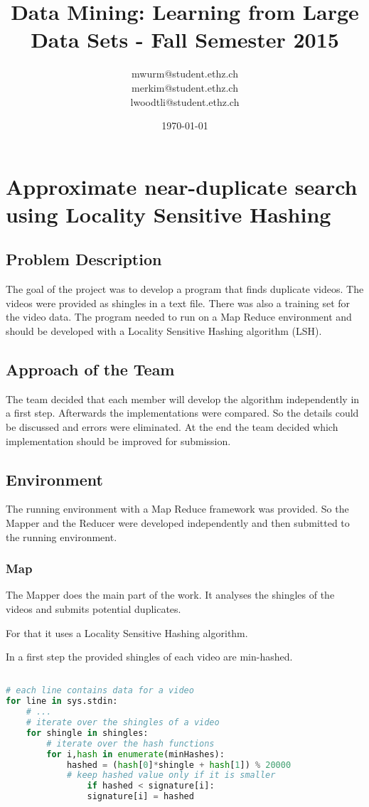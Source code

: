 \documentclass[a4paper, 11pt]{article}
\title{Data Mining: Learning from Large Data Sets - Fall Semester 2015}
\author{mwurm@student.ethz.ch\\ merkim@student.ethz.ch\\ lwoodtli@student.ethz.ch\\}
\date{\today}
\begin{document}
\maketitle

\section*{Approximate near-duplicate search using Locality Sensitive Hashing} 

\subsection{Problem Description}

The goal of the project was to develop a program that finds duplicate videos.
The videos were provided as shingles in a text file. There was also a training
set for the video data.
The program needed to run on a Map Reduce environment and should be developed
with a Locality Sensitive Hashing algorithm (LSH).


\subsection{Approach of the Team}
The team decided that each member will develop the algorithm independently in a first step.
Afterwards the implementations were compared. So the details could be
discussed and errors were eliminated.
At the end the team decided which implementation should be improved for
submission.

\subsection{Environment}
The running environment with a Map Reduce framework was provided. So the
Mapper and the Reducer were developed independently and then submitted to
the running environment.

\subsubsection{Map}

The Mapper does the main part of the work. It analyses the shingles of the
videos and submits potential duplicates.

For that it uses a Locality Sensitive Hashing algorithm.

In a first step the provided shingles of each video are min-hashed.

\begin{lstlisting}[language=Python]

# each line contains data for a video
for line in sys.stdin:
	# ...
	# iterate over the shingles of a video
	for shingle in shingles:
		# iterate over the hash functions
		for i,hash in enumerate(minHashes):
			hashed = (hash[0]*shingle + hash[1]) % 20000
			# keep hashed value only if it is smaller 
				if hashed < signature[i]:
				signature[i] = hashed
\end{lstlisting}
\end{document}
